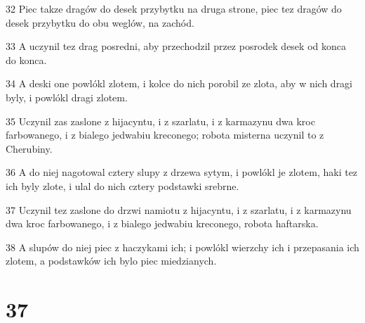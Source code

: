 \par 32 Piec takze dragów do desek przybytku na druga strone, piec tez dragów do desek przybytku do obu weglów, na zachód.
\par 33 A uczynil tez drag posredni, aby przechodzil przez posrodek desek od konca do konca.
\par 34 A deski one powlókl zlotem, i kolce do nich porobil ze zlota, aby w nich dragi byly, i powlókl dragi zlotem.
\par 35 Uczynil zas zaslone z hijacyntu, i z szarlatu, i z karmazynu dwa kroc farbowanego, i z bialego jedwabiu kreconego; robota misterna uczynil to z Cherubiny.
\par 36 A do niej nagotowal cztery slupy z drzewa sytym, i powlókl je zlotem, haki tez ich byly zlote, i ulal do nich cztery podstawki srebrne.
\par 37 Uczynil tez zaslone do drzwi namiotu z hijacyntu, i z szarlatu, i z karmazynu dwa kroc farbowanego, i z bialego jedwabiu kreconego, robota haftarska.
\par 38 A slupów do niej piec z haczykami ich; i powlókl wierzchy ich i przepasania ich zlotem, a podstawków ich bylo piec miedzianych.

\chapter{37}

